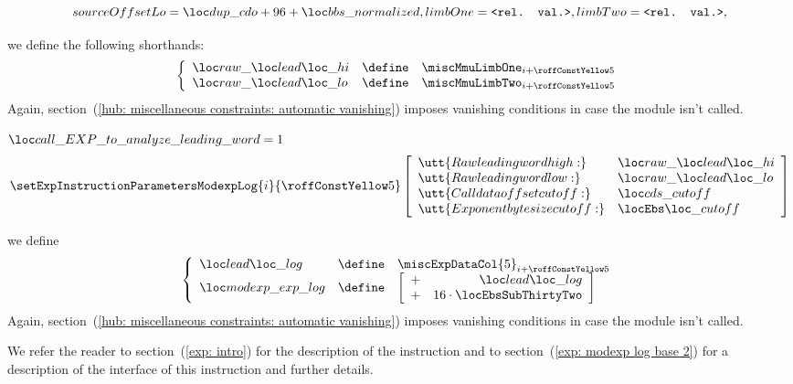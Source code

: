 \begin{description}
\begin{description}
\[{								sourceOffsetLo = \locPrcCdo + 96 + \locBbsNormalized ,
								limbOne        = \relevantValue                      ,
								limbTwo        = \relevantValue                      ,
							}
						\]
					\item[\underline{Setting some shorthands:}]
						we define the following shorthands:
						\[
							\left\{ \begin{array}{lcl}
								\locRawLeadingWordHi & \define & \miscMmuLimbOne _{i + \prcModexpLeadRowOffset} \\
								\locRawLeadingWordLo & \define & \miscMmuLimbTwo _{i + \prcModexpLeadRowOffset} \\
							\end{array} \right.
						\]
						\saNote{}
						Again, section~(\ref{hub: miscellaneous constraints: automatic vanishing})
						imposes vanishing conditions in case the \mmuMod{} module isn't called.
					\item[\underline{Setting \expMod{} values:}]
						\If $\locCallExpForModexpToAnalyzeLeadingWord = 1$ \Then
						\[
							\setExpInstructionParametersModexpLog {i}{\prcModexpLeadRowOffset}
							\left[ \begin{array}{ll}
								\utt{Raw leading word high:}     & \locRawLeadingWordHi  \\
								\utt{Raw leading word low:}      & \locRawLeadingWordLo  \\
								\utt{Call data offset cutoff:}   & \locCdsCutoff         \\
								\utt{Exponent byte size cutoff:} & \locEbsCutoff         \\
							\end{array} \right]
						\]
					\item[\underline{Setting some shorthands:}]
						we define
						\[
							\left\{ \begin{array}{lcl}
								\locLeadingWordLog    & \define & \miscExpDataCol{5}_{i + \prcModexpLeadRowOffset} \\
								\locModexpExponentLog & \define &
								\left[ \begin{array}{cr}
									+ & \locLeadingWordLog           \\
									+ & 16 \cdot \locEbsSubThirtyTwo \\
								\end{array} \right] \\
							\end{array} \right.
						\]
						\saNote{}
						Again, section~(\ref{hub: miscellaneous constraints: automatic vanishing})
						imposes vanishing conditions in case the \expMod{} module isn't called.
				\end{description}
			\end{description}
			\saNote{} We refer the reader to
			section~(\ref{exp: intro}) for the description of the \expInstModexpLog{} instruction and to
			section~(\ref{exp: modexp log base 2}) for a description of the interface of this instruction and further details.

